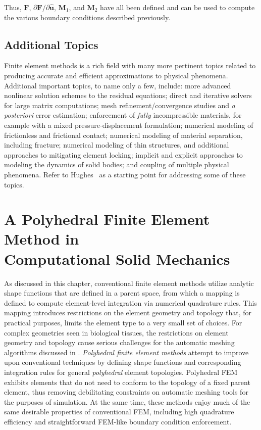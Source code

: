 Thus, $\bm{F}$, ${\partial \bm{F}}/{\partial \hat{\bm{u}}}$, $\bm{M}_1$, and $\bm{M}_2$ have all been defined and can be used to compute the various boundary conditions described previously.

\subsection{Additional Topics}
Finite element methods is a rich field with many more pertinent topics related to producing accurate and efficient approximations to physical phenomena. Additional important topics, to name only a few, include: more advanced nonlinear solution schemes to the residual equations; direct and iterative solvers for large matrix computations; mesh refinement/convergence studies and \textit{a posteriori} error estimation; 
enforcement of \textit{fully} incompressible materials, for example with a mixed pressure-displacement formulation; numerical modeling of frictionless and frictional contact; numerical modeling of material separation, including fracture; numerical modeling of thin structures, and additional approaches to mitigating element locking; implicit and explicit approaches to modeling the dynamics of solid bodies; and coupling of multiple physical phenomena. Refer to Hughes~\cite{hughes_2000} as a starting point for addressing some of these topics.

\section[A Polyhedral Finite Element Method in Computational Solid \\ Mechanics]{\texorpdfstring{A Polyhedral Finite Element Method in \\ Computational Solid Mechanics}{A Polyhedral Finite Element Method in Computational Solid \\ Mechanics}}
\label{A Polyhedral Finite Element Method in Computational Solid Mechanics}

As discussed in this chapter, conventional finite element methods utilize analytic shape functions that are defined in a parent space, from which a mapping is defined to compute element-level integration via numerical quadrature rules. This mapping introduces restrictions on the element geometry and topology that, for practical purposes, limits the element type to a very small set of choices. For complex geometries seen in biological tissues, the restrictions on element geometry and topology cause serious challenges for the automatic meshing algorithms discussed in . \textit{Polyhedral finite element methods} attempt to improve upon conventional techniques by defining shape functions and corresponding integration rules for general  \textit{polyhedral} element topologies. Polyhedral FEM exhibits elements that do not need to conform to the topology of a fixed parent element, thus removing debilitating constraints on automatic meshing tools for the purposes of simulation. At the same time, these methods enjoy much of the same desirable properties of conventional FEM, including high quadrature efficiency and straightforward FEM-like boundary condition enforcement.

